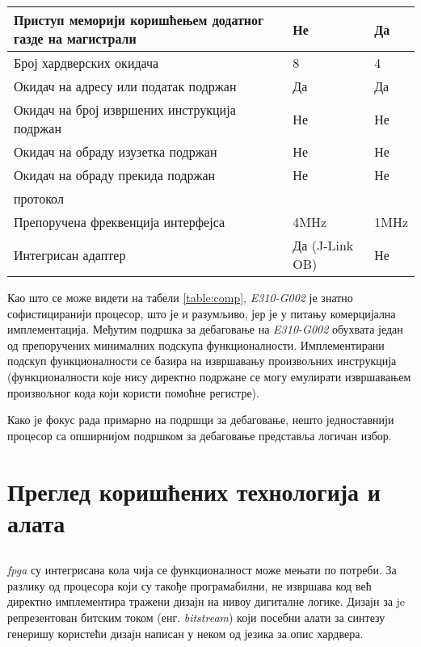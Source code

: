 \begin{table}[h!]
\begin{tabular}{|p{5.5cm}|l|l|}
		\hline Приступ меморији коришћењем додатног газде на магистрали & Не & Да \\
		\hline Број хардверских окидача & 8 & 4 \\
		\hline Окидач на адресу или податак подржан & Да & Да\footnotemark \\
		\hline Окидач на број извршених инструкција подржан & Не & Не \\
		\hline Окидач на обраду изузетка подржан & Не & Не \\
		\hline Окидач на обраду прекида подржан & Не & Не \\
		\hline {}{} протокол & \јтаг{} & {} \\
		\hline Препоручена фреквенција {} интерфејса & 4MHz & 1MHz \\
		\hline Интегрисан {} адаптер & Да (J-Link OB) & Не \\
		\hline
	\end{tabular}
\end{table}


Као што се може видети на табели \ref{table:comp}, \textit{E310-G002} је знатно софистициранији процесор, што је и разумљиво, јер је у питању комерцијална имплементација.
Међутим подршка за дебаговање на \textit{E310-G002} обухвата један од препоручених минималних подскупа функционалности. 
Имплементирани подскуп функционалности се базира на извршавању произвољних инструкција (функционалности које нису директно подржане се могу емулирати извршавањем произвољног кода који користи помоћне регистре).

Како је фокус рада примарно на подршци за дебаговање, нешто једноставнији процесор са опширнијом подршком за дебаговање представља логичан избор.

\section{Преглед коришћених технологија и алата}

\subsection{}

\textit{\acrfull{fpga}} су интегрисана кола чија се функционалност може мењати по потреби. За разлику од процесора који су такође програмабилни,  не извршава код већ директно имплементира тражени дизајн на нивоу дигиталне логике. Дизајн за  je репрезентован битским током (енг. \textit{bitstream}) који посебни алати за синтезу генеришу користећи дизајн написан у неком од језика за опис хардвера.

